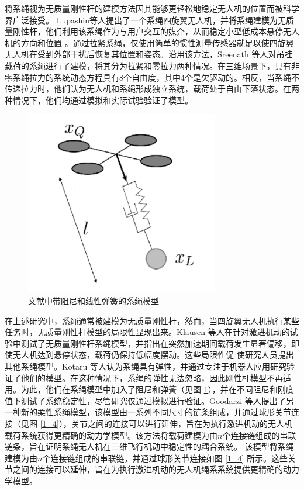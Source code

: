 \documentclass[lang=chs, degree=master, blindreview=false, winfonts=true]{yanputhesis}
\begin{document}
将系绳视为无质量刚性杆的建模方法因其能够更轻松地稳定无人机的位置而被科学界广泛接受。
Lupashin等人\cite{lupashin2013stabilization}提出了一个系绳四旋翼无人机，并将系绳建模为无质量刚性杆，他们利用该系绳作为与用户交互的媒介，从而稳定小型低成本悬停无人机的方向和位置  。通过拉紧系绳，仅使用简单的惯性测量传感器就足以使四旋翼无人机在受到外部干扰后恢复其位置和姿态。沿用该方法，Sreenath 等人\cite{sreenath2013trajectory}对吊挂载荷的系绳进行了建模，将其分为拉紧和零拉力两种情况。在三维场景下，具有非零系绳拉力的系统动态方程具有8个自由度，其中4个是欠驱动的。相反，当系绳不传递拉力时，他们认为无人机和系绳形成独立系统，载荷处于自由下落状态。在两种情况下，他们均通过模拟和实际试验验证了模型。

\begin{figure}[hbt!]
	\centering 
	\includegraphics[width=20pc]{picture/1_3.png} 
	\caption{文献中带阻尼和线性弹簧的系绳模型} \label{1_3}
\end{figure}
在上述研究中，系绳通常被建模为无质量刚性杆，然而，当四旋翼无人机执行某些任务时，无质量刚性杆模型的局限性显现出来\cite{castillo2019disturbance,estevez2021hybrid}。Klausen 等人\cite{klausen2017nonlinear}在针对激进机动的试验中测试了无质量刚性杆系绳模型，并指出在突然加速期间载荷发生显著偏移，即使无人机达到悬停状态，载荷仍保持低幅度摆动。这些局限性促 使研究人员提出其他系绳模型。Kotaru 等人\cite{kotaru2017dynamics}认为系绳具有弹性，并通过专注于机器人应用研究验证了他们的模型。在这种情况下，系绳的弹性无法忽略，因此刚性杆模型不再适用。为此，他们在系绳模型中加入了阻尼和弹簧（见图 \ref{1_3}），并在不同阻尼和刚度值下测试了系统稳定性，尽管研究仅通过模拟进行验证。Goodarzi 等人\cite{goodarzi2015geometric}提出了另一种新的柔性系绳模型，该模型由一系列不同尺寸的链条组成，并通过球形关节连接（见图 \ref{1_4}），关节之间的连接可以进行延伸，旨在为执行激进机动的无人机载荷系统获得更精确的动力学模型。该方法将载荷建模为由$n$个连接链组成的串联链条，旨在证明系绳无人机在三维飞行机动中稳定性的耦合系统。
该模型将系绳建模为由$n$个连接链组成的串联链，并通过球形关节连接如图 \ref{1_4} 所示。这些关节之间的连接可以延伸，旨在为执行激进机动的无人机绳系系统提供更精确的动力学模型。
\end{document}
